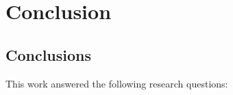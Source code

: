     
    
    
    
    





\chapter{Conclusion}\label{chap:conclusion}
\section{Conclusions}\label{sec:conclusions}
    This work answered the following research questions:
    
   


